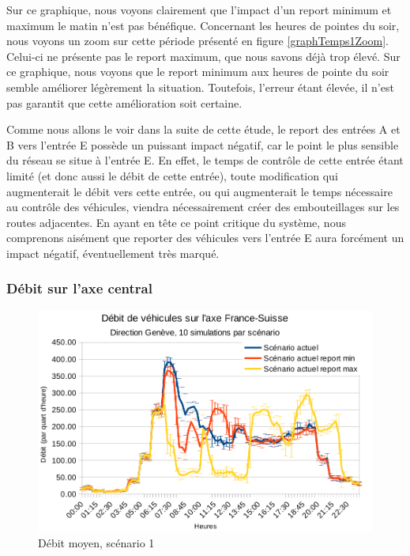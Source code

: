 \documentclass[a4paper,11pt, titlepage]{extarticle}
\begin{document}
\newpage

Sur ce graphique, nous voyons clairement que l'impact d'un report minimum et maximum le matin n'est pas bénéfique. Concernant les heures de pointes du soir, nous voyons un zoom sur cette période présenté en figure \ref{graphTemps1Zoom}. Celui-ci ne présente pas le report maximum, que nous savons déjà trop élevé. Sur ce graphique, nous voyons que le report minimum aux heures de pointe du soir semble améliorer légèrement la situation. Toutefois, l'erreur étant élevée, il n'est pas garantit que cette amélioration soit certaine.

\vspace{0.4cm}

Comme nous allons le voir dans la suite de cette étude, le report des entrées A et B vers l'entrée E possède un puissant impact négatif, car le point le plus sensible du réseau se situe à l'entrée E. En effet, le temps de contrôle de cette entrée étant limité (et donc aussi le débit de cette entrée), toute modification qui augmenterait le débit vers cette entrée, ou qui augmenterait le temps nécessaire au contrôle des véhicules, viendra nécessairement créer des embouteillages sur les routes adjacentes. En ayant en tête ce point critique du système, nous comprenons aisément que reporter des véhicules vers l'entrée E aura forcément un impact négatif, éventuellement très marqué.

\subsubsection{Débit sur l'axe central}

\begin{figure}[!h]
  \begin{center}
    \includegraphics[width=13cm]{graphiques/compteur_1a.png}
  \end{center}
  \vspace{-0.8cm}
  \caption{Débit moyen, scénario 1}
  \label{graphCompteur1A}
\end{figure}
\end{document}
